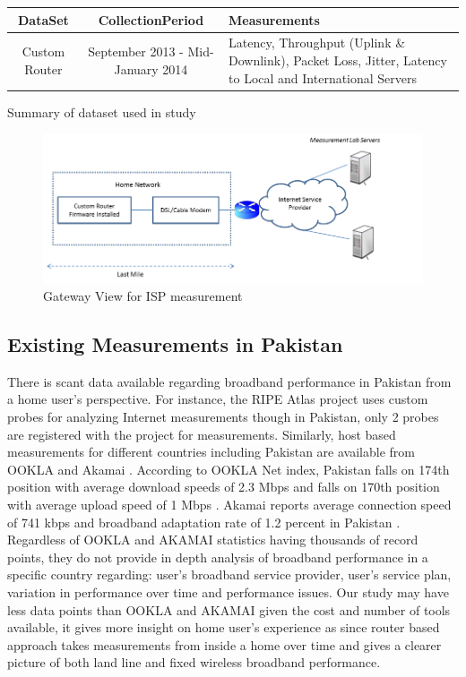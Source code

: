 \documentclass{sig-alternate-10pt}
\begin{document}
 \begin {table*}[t]
\centering

\begin{tabular}{|c|c|p{3in}|}
\hline
\centering \textbf{DataSet} & \centering \textbf{CollectionPeriod}&  \textbf{Measurements}\\
\hline
 \centering Custom Router & \centering September 2013 - Mid-January 2014  &  Latency, Throughput (Uplink \& Downlink), Packet Loss, Jitter, Latency to Local and International Servers \\

\hline
\end{tabular}
\caption{Summary of dataset used in study}
\label {Table:1}
\end {table*}




\begin{figure}[h!]
\begin {center}
   \includegraphics[height=0.2 \textheight,width=0.48 \textwidth]{gateway.png}
   \end {center}
 \caption{Gateway View for ISP measurement}
 \label {Fig:gateway}
\end{figure}
\subsection {Existing Measurements in Pakistan}
There is scant data available regarding broadband performance in Pakistan from a home user's perspective. For instance, the RIPE Atlas project  \cite{21} uses custom probes for analyzing Internet measurements though in Pakistan, only 2 probes are registered with the project for measurements. Similarly, host based measurements for different countries including Pakistan are available from OOKLA \cite{20} and Akamai \cite{05}. According to OOKLA Net index, Pakistan falls on 174th position with average download speeds of 2.3 Mbps and falls on 170th position with average upload speed of 1 Mbps \cite{07}. Akamai \cite{05} reports average connection speed of 741 kbps and broadband adaptation rate of 1.2 percent in Pakistan \cite{28}.\\
\indent Regardless of OOKLA and AKAMAI statistics having thousands of record points, they do not provide in depth analysis of broadband performance in a specific country regarding: user's broadband service provider, user's service plan, variation in performance over time and performance issues. Our study may have less data points than OOKLA and AKAMAI given the cost and number of tools available, it gives more insight on home user's experience as since router based approach takes measurements from inside a home over time and gives a clearer picture of both land line and fixed wireless broadband performance.
\end{document}

